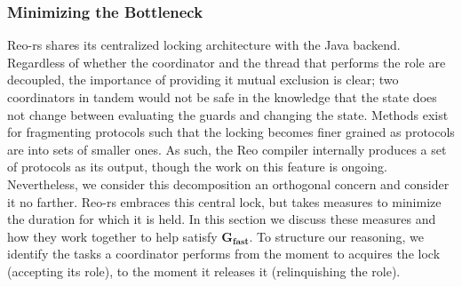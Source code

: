 \subsubsection{Minimizing the Bottleneck}
\label{sec:minimizing_the_bottleneck}
Reo-rs shares its centralized locking architecture with the Java backend. Regardless of whether the coordinator and the thread that performs the role are decoupled, the importance of providing it mutual exclusion is clear; two coordinators in tandem would not be safe in the knowledge that the state does not change between evaluating the guards and changing the state. Methods exist for fragmenting protocols such that the locking becomes finer grained as protocols are into sets of smaller ones. As such, the Reo compiler internally produces a set of protocols as its output, though the work on this feature is ongoing. Nevertheless, we consider this decomposition an orthogonal concern and consider it no farther. Reo-rs embraces this central lock, but takes measures to minimize the duration for which it is held. In this section we discuss these measures and how they work together to help satisfy $\boldsymbol{G_{fast}}$. To structure our reasoning, we identify the tasks a coordinator performs from the moment to acquires the lock (accepting its role), to the moment it releases it (relinquishing the role). 

